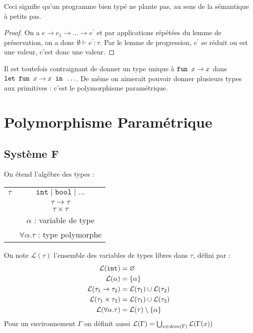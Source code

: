 \documentclass{cours}
\begin{document}
\begin{remark}
    Ceci signifie qu'un programme bien typé ne plante pas, au sens de la sémantique à petits pas.
\end{remark}

\begin{proof}
    On a $e \rightarrow e_{1} \rightarrow \ldots \rightarrow e^{'}$ et par applications répétées du lemme de préservation, on a donc $\emptyset \vdash e^{'} : \tau$. Par le lemme de progression, $e^{'}$ se réduit ou est une valeur, c'est donc une valeur.
\end{proof}

Il est toutefois contraignant de donner un type unique à $\texttt{fun } x \rightarrow x$ dans $\texttt{let } \texttt{fun } x \rightarrow x \texttt{ in }\ldots$. De même on aimerait pouvoir donner plusieurs types aux primitives : c'est le polymorphisme paramétrique.

\section{Polymorphisme Paramétrique}
\subsection{Système F}
On étend l'algèbre des types :
\begin{tabular}{c@{$\mid$}c}
    $\tau$ & $\texttt{int} \mid \texttt{bool} \mid \ldots$ \\
           & $\tau \rightarrow \tau$                       \\
           & $\tau \times \tau$                            \\
           & $\alpha$ : variable de type                   \\
           & $\forall\alpha.\tau$ : type polymorphe
\end{tabular}

\begin{definition}
    On note $\mathcal{L}(\tau)$ l'ensemble des variables de types libres dans $\tau$, défini par :
    \[
        \begin{aligned}
            \mathcal{L}(\texttt{int})                         & = \varnothing                                 \\
            \mathcal{L}(\alpha)                        & = \left\{\alpha\right\}                     \\
            \mathcal{L}(\tau_{1} \rightarrow \tau_{2}) & = \mathcal{L}(\tau_{1}) \cup \mathcal{L}(\tau_{2})          \\
            \mathcal{L}(\tau_{1} \times \tau_{2})      & = \mathcal{L}(\tau_{1}) \cup \mathcal{L}(\tau_{2})          \\
            \mathcal{L}(\forall\alpha.\tau)            & = \mathcal{L}(\tau) \setminus \left\{\alpha\right\}
        \end{aligned}
    \]
    Pour un environnement $\Gamma$ on définit aussi $\mathcal{L}(\Gamma) = \bigcup_{x \in dom(\Gamma)} \mathcal{L}(\Gamma(x))$
\end{definition}
\end{document}
